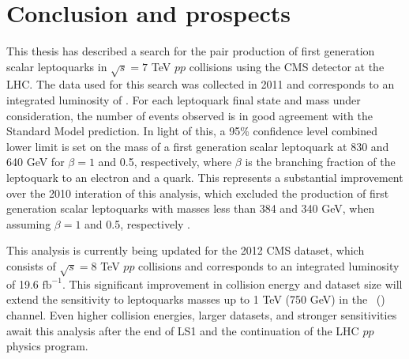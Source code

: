 \chapter{Conclusion and prospects}
\label{ch:conclusion}

This thesis has described a search for the
pair production of first generation scalar leptoquarks
in $\sqrt{s} = 7$ TeV $pp$ collisions 
using the CMS detector at the LHC.
The data used for this search was collected in 2011 and 
corresponds to an integrated
luminosity of \lumi.  For each leptoquark
final state and mass under consideration,
the number of events observed is in good agreement with 
the Standard Model prediction.  In light of this, a
95\% confidence level combined lower limit is set on the mass of a
first generation scalar leptoquark at 830 and 640 GeV for $\beta = 1$ and 0.5, respectively,
where $\beta$ is the branching fraction of the leptoquark to an electron
and a quark.  This represents a substantial improvement over the 2010 
interation of this analysis, which 
excluded the production of first generation scalar leptoquarks
with masses less than 384 and 340 GeV, when assuming $\beta = 1$ and 0.5, respectively \cite{lq1-paolo,lq1-dinko}.

This analysis is currently being updated for the 2012 CMS dataset, 
which consists of $\sqrt{s} = 8$ TeV $pp$ collisions and corresponds to 
an integrated luminosity of 19.6 $\text{fb}^{-1}$.
This significant improvement in collision energy and dataset size will extend 
the sensitivity to leptoquarks masses up to 1 TeV (750 GeV) in the \eejj~(\enujj)
channel.  Even higher collision energies, larger datasets, and stronger sensitivities 
await this analysis after the end of LS1 and the continuation of the LHC $pp$ physics program.

